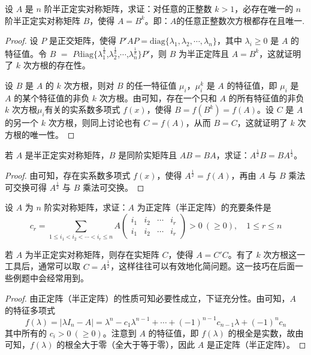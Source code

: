 \documentclass[../../main.tex]{subfiles}
\begin{document}
\begin{proposition}\label{proposition:例9.61}
设 \(A\) 是 \(n\) 阶半正定实对称矩阵，求证：对任意的正整数 \(k > 1\)，必存在唯一的 \(n\) 阶半正定实对称矩阵 \(B\)，使得 \(A = B^k\)。即：$A$的任意正整数次方根都存在且唯一.
\end{proposition}
\begin{proof}
设 \(P\) 是正交矩阵，使得 \(P'AP = \mathrm{diag}\{\lambda_1,\lambda_2,\cdots,\lambda_n\}\)，其中 \(\lambda_i \geqslant  0\) 是 \(A\) 的特征值。令 $B$ $=$ $P$$\mathrm{diag}$$\{$$\lambda_1^{\frac{1}{k}}$,$\lambda_2^{\frac{1}{k}}$,$\cdots$,$\lambda_n^{\frac{1}{k}}$$\}$$P'$，则 \(B\) 为半正定阵且 \(A = B^k\)，这就证明了 \(k\) 次方根的存在性。

设 \(B\) 是 \(A\) 的 \(k\) 次方根，则对 \(B\) 的任一特征值 \(\mu_i\)，\(\mu_i^k\) 是 \(A\) 的特征值，即 \(\mu_i\) 是 \(A\) 的某个特征值的非负 \(k\) 次方根。由可知，存在一个只和 \(A\) 的所有特征值的非负 \(k\) 次方根$\mu_i$有关的实系数多项式 \(f(x)\)，使得 \(B = f(B^k) = f(A)\)。设 \(C\) 是 \(A\) 的另一个 \(k\) 次方根，则同上讨论也有 \(C = f(A)\)，从而 \(B = C\)，这就证明了 \(k\) 次方根的唯一性。 
\end{proof}

\begin{proposition}\label{proposition:例9.62}
若 \(A\) 是半正定实对称矩阵，\(B\) 是同阶实矩阵且 \(AB = BA\)，求证：\(A^{\frac{1}{2}}B = BA^{\frac{1}{2}}\)。
\end{proposition}
\begin{proof}
由可知，存在实系数多项式 \(f(x)\)，使得 \(A^{\frac{1}{2}} = f(A)\)，再由 \(A\) 与 \(B\) 乘法可交换可得 \(A^{\frac{1}{2}}\) 与 \(B\) 乘法可交换。
\end{proof}

\begin{proposition}\label{proposition:例9.63}
设 \(A\) 为 \(n\) 阶实对称矩阵，求证：\(A\) 为正定阵（半正定阵）的充要条件是
\[
c_r = \sum_{1\leqslant  i_1 < i_2 < \cdots < i_r \leqslant  n}A\begin{pmatrix}
i_1 & i_2 & \cdots & i_r \\
i_1 & i_2 & \cdots & i_r
\end{pmatrix} > 0\ (\geqslant  0),\quad 1\leqslant  r \leqslant  n
\]
\end{proposition}
\begin{remark}
若 \(A\) 为半正定实对称矩阵，则存在实矩阵 \(C\)，使得 \(A = C'C\)。有了 \(k\) 次方根这一工具后，通常可以取 \(C = A^{\frac{1}{2}}\)，这样往往可以有效地化简问题。这一技巧在后面一些例题中会经常用到。 
\end{remark}
\begin{proof}
由正定阵（半正定阵）的性质可知必要性成立，下证充分性。由可知，\(A\) 的特征多项式
\[
f(\lambda) = |\lambda I_n - A| = \lambda^n - c_1\lambda^{n - 1} + \cdots + (-1)^{n - 1}c_{n - 1}\lambda + (-1)^nc_n
\]
其中所有的 \(c_i > 0\ (\geqslant  0)\)。注意到 \(A\) 的特征值，即 \(f(\lambda)\) 的根全是实数，故由可知，\(f(\lambda)\) 的根全大于零（全大于等于零），因此 \(A\) 是正定阵（半正定阵）。
\end{proof}
\end{document}
